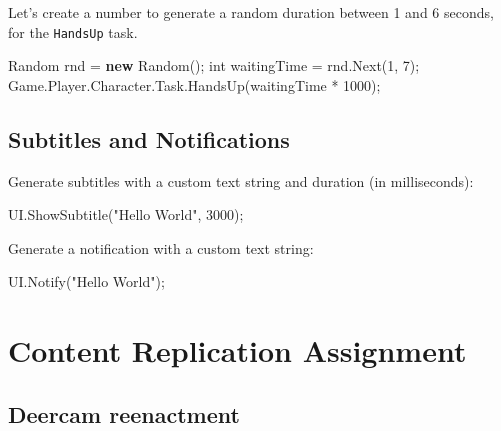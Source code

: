 \documentclass[
  openany]{book}
\newenvironment{Shaded}{\begin{snugshade}}{\end{snugshade}}
\newcommand{\DataTypeTok}[1]{\textcolor[rgb]{0.13,0.29,0.53}{#1}}
\newcommand{\DecValTok}[1]{\textcolor[rgb]{0.00,0.00,0.81}{#1}}
\newcommand{\FunctionTok}[1]{\textcolor[rgb]{0.00,0.00,0.00}{#1}}
\newcommand{\KeywordTok}[1]{\textcolor[rgb]{0.13,0.29,0.53}{\textbf{#1}}}
\newcommand{\NormalTok}[1]{#1}
\newcommand{\StringTok}[1]{\textcolor[rgb]{0.31,0.60,0.02}{#1}}
\begin{document}
Let's create a number to generate a random duration between 1 and 6 seconds, for the \texttt{HandsUp} task.

\begin{Shaded}
\begin{Highlighting}[]
\NormalTok{Random rnd = }\KeywordTok{new} \FunctionTok{Random}\NormalTok{(); }
\DataTypeTok{int}\NormalTok{ waitingTime = rnd.}\FunctionTok{Next}\NormalTok{(}\DecValTok{1}\NormalTok{, }\DecValTok{7}\NormalTok{);}
\NormalTok{Game.}\FunctionTok{Player}\NormalTok{.}\FunctionTok{Character}\NormalTok{.}\FunctionTok{Task}\NormalTok{.}\FunctionTok{HandsUp}\NormalTok{(waitingTime * }\DecValTok{1000}\NormalTok{);}
\end{Highlighting}
\end{Shaded}

\hypertarget{subtitles-and-notifications}{%
\subsection*{Subtitles and Notifications}\label{subtitles-and-notifications}}

Generate subtitles with a custom text string and duration (in milliseconds):

\begin{Shaded}
\begin{Highlighting}[]
\NormalTok{UI.}\FunctionTok{ShowSubtitle}\NormalTok{(}\StringTok{"Hello World"}\NormalTok{, }\DecValTok{3000}\NormalTok{);}
\end{Highlighting}
\end{Shaded}

Generate a notification with a custom text string:

\begin{Shaded}
\begin{Highlighting}[]
\NormalTok{UI.}\FunctionTok{Notify}\NormalTok{(}\StringTok{"Hello World"}\NormalTok{);}
\end{Highlighting}
\end{Shaded}

\hypertarget{content-replication-assignment-3}{%
\section*{Content Replication Assignment}\label{content-replication-assignment-3}}

\hypertarget{deercam-reenactment}{%
\subsection*{Deercam reenactment}\label{deercam-reenactment}}
\end{document}
